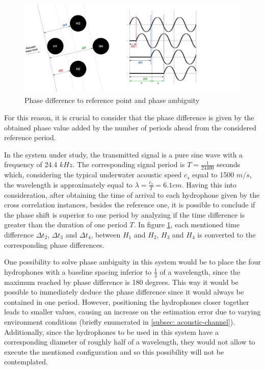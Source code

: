 \begin{figure}[!htbp]
	\centering
	\includegraphics[width=1.2\textwidth]{figures/phase-diff}
	\caption{Phase difference to reference point and phase ambiguity}
	\label{fig:phasediff}
\end{figure}

For this reason, it is crucial to consider that the phase difference is given by the obtained phase value added by the number of periods ahead from the considered reference period.

In the system under study, the transmitted signal is a pure sine wave with a frequency of 24.4 $kHz$. The corresponding signal period is $T = \frac{1}{24400} $ seconds which, considering the typical underwater acoustic speed $c_s$ equal to 1500 $m/s$, the wavelength is approximately equal to $\lambda = \frac{c_s}{T} = 6.1 cm$. Having this into consideration, after obtaining the time of arrival to each hydrophone given by the cross correlation instances, besides the reference one, it is possible to conclude if the phase shift is superior to one period by analyzing if the time difference is greater than the duration of one period $T$. In figure \ref{fig:phasediff}, each mentioned time difference $\Delta t_2$, $\Delta t_3$ and $\Delta t_4$, between $H_1$ and $H_2$, $H_3$ and $H_4$ is converted to the corresponding phase differences.

One possibility to solve phase ambiguity in this system would be to place the four hydrophones with a baseline spacing inferior to $\frac{1}{2}$ of a wavelength, since the maximum reached by phase difference is 180 degrees. This way it would be possible to immediately deduce the phase difference since it would always be contained in one period. However, positioning the hydrophones closer together leads to smaller  values, causing an increase on the estimation error due to varying environment conditions (briefly enumerated in \ref{subsec: acoustic-channel}). Additionally, since the hydrophones to be used in this system have a corresponding diameter of roughly half of a wavelength, they would not allow to execute the mentioned configuration and so this possibility will not be contemplated.

